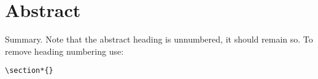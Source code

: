 \section*{Abstract} %

Summary. Note that the abstract heading is unnumbered, it should remain so. To remove heading numbering use:
\begin{verbatim}
\section*{}
\end{verbatim}